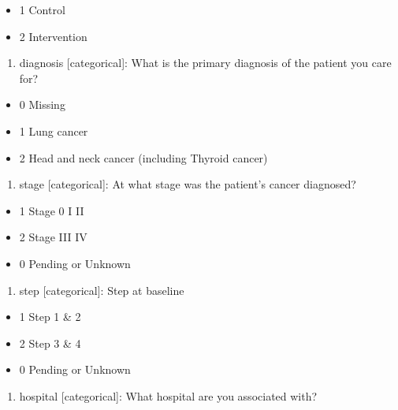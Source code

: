 \documentclass[
  letterpaper,
  DIV=11,
  numbers=noendperiod]{scrreprt}
\providecommand{\tightlist}{%
  \setlength{\itemsep}{0pt}\setlength{\parskip}{0pt}}\usepackage{longtable,booktabs,array}
\begin{document}
\begin{itemize}
\tightlist
\item
  1 Control
\item
  2 Intervention
\end{itemize}

\begin{enumerate}
\def\labelenumi{\arabic{enumi}.}
\setcounter{enumi}{17}
\tightlist
\item
  diagnosis {[}categorical{]}: What is the primary diagnosis of the
  patient you care for?
\end{enumerate}

\begin{itemize}
\tightlist
\item
  0 Missing
\item
  1 Lung cancer
\item
  2 Head and neck cancer (including Thyroid cancer)
\end{itemize}

\begin{enumerate}
\def\labelenumi{\arabic{enumi}.}
\setcounter{enumi}{18}
\tightlist
\item
  stage {[}categorical{]}: At what stage was the patient's cancer
  diagnosed?
\end{enumerate}

\begin{itemize}
\tightlist
\item
  1 Stage 0 I II
\item
  2 Stage III IV
\item
  0 Pending or Unknown
\end{itemize}

\begin{enumerate}
\def\labelenumi{\arabic{enumi}.}
\setcounter{enumi}{19}
\tightlist
\item
  step {[}categorical{]}: Step at baseline
\end{enumerate}

\begin{itemize}
\tightlist
\item
  1 Step 1 \& 2
\item
  2 Step 3 \& 4
\item
  0 Pending or Unknown
\end{itemize}

\begin{enumerate}
\def\labelenumi{\arabic{enumi}.}
\setcounter{enumi}{20}
\tightlist
\item
  hospital {[}categorical{]}: What hospital are you associated with?
\end{enumerate}
\end{document}
